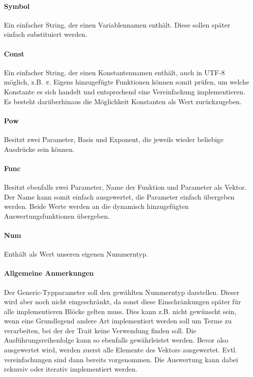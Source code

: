 \documentclass[11pt,a4paper, ngerman]{article}
\begin{document}
\paragraph{Symbol} Ein einfacher String, der einen Variablennamen enthält. Diese sollen später einfach substituiert werden.

\paragraph{Const} Ein einfacher String, der einen Konstantennamen enthält, auch in UTF-8 möglich, z.B. $\pi$. Eigens hinzugefügte Funktionen können somit prüfen, um welche Konstante es sich handelt und entsprechend eine Vereinfachung implementieren. Es besteht darüberhinaus die Möglichkeit Konstanten als Wert zurückzugeben.

\paragraph{Pow} Besitzt zwei Parameter, Basis und Exponent, die jeweils wieder beliebige Ausdrücke sein können.

\paragraph{Func} Besitzt ebenfalls zwei Parameter, Name der Funktion und Parameter als Vektor. Der Name kann somit einfach ausgewertet, die Parameter einfach übergeben werden. Beide Werte werden an die dynamisch hinzugefügten Auswertungsfunktionen übergeben.

\paragraph{Num} Enthält als Wert unseren eigenen Nummerntyp.

\paragraph{Allgemeine Anmerkungen} Der Generic-Typparameter  soll den gewählten Nummerntyp darstellen. Dieser wird aber noch nicht eingeschränkt, da sonst diese Einschränkungen später für alle implementieren Blöcke gelten muss. Dies kann z.B. nicht gewünscht sein, wenn eine Grundlegend andere Art implementiert werden soll um Terme zu verarbeiten, bei der der Trait  keine Verwendung finden soll. Die Ausführungsreihenfolge kann so ebenfalls gewährleistet werden. Bevor also  ausgewertet wird, werden zuerst alle Elemente des Vektors ausgewertet. Evtl. vereinfachungen sind dann bereits vorgenommen. Die Auswertung kann dabei rekursiv oder iterativ implementiert werden.
\end{document}
